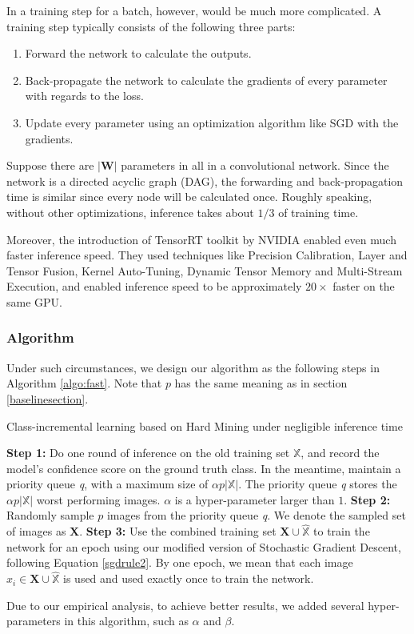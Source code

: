 In a training step for a batch, however, would be much more complicated. A training step typically consists of the following three parts:
\begin{enumerate}
	\item  Forward the network to calculate the outputs.
	\item Back-propagate the network to calculate the gradients of every parameter with regards to the loss.
	\item Update every parameter using an optimization algorithm like SGD with the gradients.
\end{enumerate}
Suppose there are $|\mathbf{W}|$ parameters in all in a convolutional network. Since the network is a directed acyclic graph (DAG), the forwarding and back-propagation time is similar since every node will be calculated once. Roughly speaking, without other optimizations, inference takes about $1/3$ of training time.

Moreover, the introduction of TensorRT toolkit by NVIDIA enabled even much faster inference speed. They used techniques like Precision Calibration, Layer and Tensor Fusion, Kernel Auto-Tuning, Dynamic Tensor Memory and Multi-Stream Execution, and enabled inference speed to be approximately $20\times$ faster on the same GPU.

\subsubsection{Algorithm}
Under such circumstances, we design our algorithm as the following steps in Algorithm \ref{algo:fast}. Note that $p$ has the same meaning as in section \ref{baselinesection}.

\begin{algorithm}
\caption{Class-incremental learning based on Hard Mining under negligible inference time}
\label{algo:fast}
	\begin{algorithmic}
		\State \textbf{Step 1:} Do one round of inference on the old training set $\mathbb{X}$, and record the model's confidence score on the ground truth class. In the meantime, maintain a priority queue \textit{q}, with a maximum size of $\alpha p |\mathbb{X}|$. The priority queue \textit{q} stores the $\alpha p |\mathbb{X}|$ worst performing images. $\alpha$ is a hyper-parameter larger than $1$.
		\State \textbf{Step 2:} Randomly sample $p$ images from the priority queue \textit{q}. We denote the sampled set of images as $\mathbf{X}$. 
		\State \textbf{Step 3:} Use the combined training set $\mathbf{X} \cup \hat{\mathbb{X}}$ to train the network for an epoch using our modified version of Stochastic Gradient Descent, following Equation \ref{sgdrule2}. By one epoch, we mean that each image $x_i \in \mathbf{X} \cup \hat{\mathbb{X}}$ is used and used exactly once to train the network.
		\EndFor
	\end{algorithmic}
\end{algorithm}
Due to our empirical analysis, to achieve better results, we added several hyper-parameters in this algorithm, such as $\alpha$ and $\beta$. 

